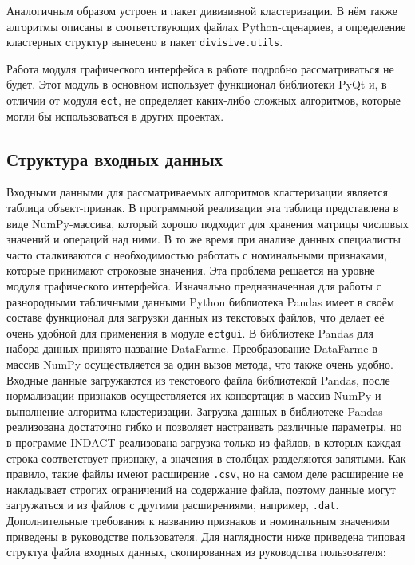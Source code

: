 \documentclass[12pt]{diploma}
\begin{document}
	Аналогичным образом устроен и пакет дивизивной кластеризации. В нём также алгоритмы описаны в соответствующих файлах Python-сценариев, а определение кластерных структур вынесено в пакет \texttt{divisive.utils}. 
	
	Работа модуля графического интерфейса в работе подробно рассматриваться не будет. Этот модуль в основном использует функционал библиотеки PyQt и, в отличии от модуля \texttt{ect}, не определяет каких-либо сложных алгоритмов, которые могли бы использоваться в других проектах. 
	
	\subsection{Структура входных данных}
	Входными данными для рассматриваемых алгоритмов кластеризации является таблица объект-признак. В программной реализации эта таблица представлена в виде NumPy-массива, который хорошо подходит для хранения матрицы числовых значений и операций над ними. В то же время при анализе данных специалисты часто сталкиваются с необходимостью работать с номинальными признаками, которые принимают строковые значения. Эта проблема решается на уровне модуля графического интерфейса. Изначально предназначенная для работы с разнородными табличными данными Python библиотека Pandas имеет в своём составе функционал для загрузки данных из текстовых файлов, что делает её очень удобной для применения в модуле \texttt{ectgui}. В библиотеке Pandas для набора данных принято название DataFarme. Преобразование DataFarme в массив NumPy осуществляется за один вызов метода, что также очень удобно. Входные данные загружаются из текстового файла библиотекой Pandas, после нормализации признаков осуществляется их конвертация в массив NumPy и выполнение алгоритма кластеризации. Загрузка данных в библиотеке Pandas реализована достаточно гибко и позволяет настраивать различные параметры, но в программе INDACT реализована загрузка только из файлов, в которых каждая строка соответствует признаку, а значения в столбцах разделяются запятыми. Как правило, такие файлы имеют расширение \texttt{.csv}, но на самом деле расширение не накладывает строгих ограничений на содержание файла, поэтому данные могут загружаться и из файлов с другими расширениями, например, \texttt{.dat}. Дополнительные требования к названию признаков и номинальным значениям приведены в руководстве пользователя. Для наглядности ниже приведена типовая структуа файла входных данных, скопированная из руководства пользователя: 
		
\end{document}
